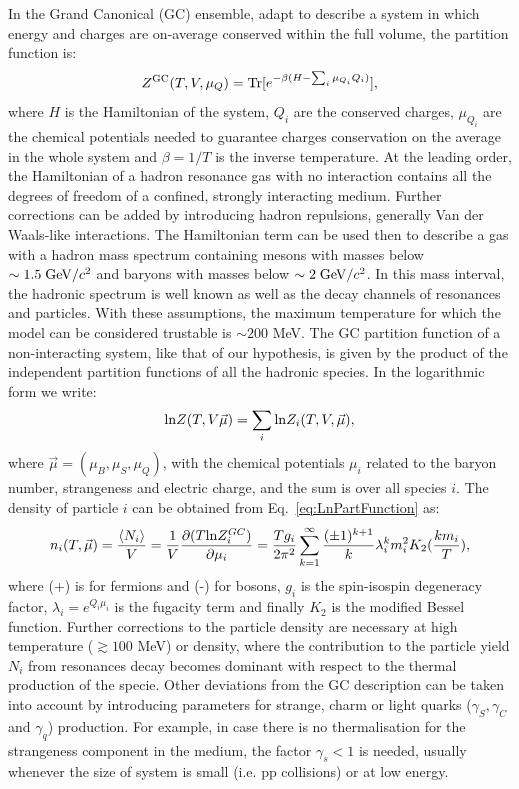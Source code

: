 In the Grand Canonical (GC) ensemble, adapt to describe a system in which energy and charges are on-average conserved within the full volume, the partition function is:
\begin{equation}
  \label{eq:PartitionFunction}
Z^{\rm GC} (T, V, \mu_{Q}) = {\rm Tr}[e^{-\beta(H - \sum_{i}{\mu_{Q_{i}}Q_{i}})}],
\end{equation}
where $H$ is the Hamiltonian of the system, $Q_{i}$ are the conserved charges, $\mu_{Q_{i}}$ are the chemical potentials needed to guarantee charges conservation on the average in the whole system and $\beta = 1/T$ is the inverse temperature. At the leading order, the Hamiltonian of a hadron resonance gas with no interaction contains all the degrees of freedom of a confined, strongly interacting medium. Further corrections can be added by introducing hadron repulsions, generally Van der Waals-like interactions. The Hamiltonian term can be used then to describe a gas with a hadron mass spectrum containing mesons with masses below $\sim 1.5 \; \mathrm{GeV}/c^{2}$ and baryons with masses below $\sim 2\; \mathrm{GeV}/c^{2}$. In this mass interval, the hadronic spectrum is well known as well as the decay channels of resonances and particles. With these assumptions, the maximum temperature for which the model can be considered trustable is $\sim 200$ MeV. The GC partition function of a non-interacting system, like that of our hypothesis, is given by the product of the independent partition functions of all the hadronic species. In the logarithmic form we write:
\begin{equation}
  \label{eq:LnPartFunction}
{\rm ln} Z(T, V \vec{\mu}) = \sum_{i} {\rm ln} Z_{i} (T, V, \vec{\mu}),
\end{equation}
where $\vec{\mu} = (\mu_B, \mu_S, \mu_Q)$, with the chemical potentials $\mu_i$ related to the baryon number, strangeness and electric charge, and the sum is over all species $i$.
The density of particle $i$ can be obtained from Eq.~\ref{eq:LnPartFunction} as:
\begin{equation}
\label{eq:ParticleDensity}
n_{i} (T, \vec{\mu}) = \frac{\langle N_{i} \rangle}{V} = \frac{1}{V}\frac{\partial (T {\rm ln}Z_i^{GC})}{\partial \mu_i} = \frac{T g_{i}}{2\pi^{2}} \sum_{k=1}^{\infty} \frac{(\pm 1)^{k+1}}{k} \lambda_{i}^{k} m_{i}^{2}K_{2}(\frac{km_{i}}{T}),
\end{equation}
where (+) is for fermions and (-) for bosons, $g_{i}$ is the spin-isospin degeneracy factor, $\lambda_{i} = e^{Q_{i}\mu_{i}}$ is the fugacity term and finally $K_{2}$ is the modified Bessel function.
Further corrections to the particle density are necessary at high temperature ($\gtrsim 100 $ MeV) or density, where the contribution to the particle yield $N_{i}$ from resonances decay becomes dominant with respect to the thermal production of the specie. Other deviations from the GC description can be taken into account by introducing parameters for strange, charm or light quarks ($\gamma_{S}, \gamma_{C}$ and $\gamma_{q}$) production. For example, in case there is no thermalisation for the strangeness component in the medium, the factor $\gamma_{s}<1$ is needed, usually whenever the size of system is small (i.e. pp collisions) or at low energy. 
